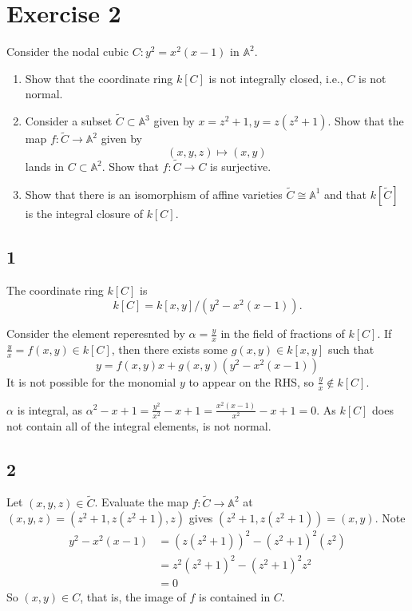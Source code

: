 \documentclass{article}
\theoremstyle{definition}
\theoremstyle{definition}
\theoremstyle{remark}
\begin{document}
\section*{Exercise 2}
Consider the nodal cubic $C: y^2 = x^2(x - 1)$ in $\mathbb{A}^2$.

\begin{enumerate}
    \item Show that the coordinate ring $k[C]$ is not integrally closed, i.e., $C$ is not normal.
    \item Consider a subset $\tilde{C} \subset \mathbb{A}^3$ given by $x = z^2 + 1, y = z(z^2 + 1)$. Show that the map $f: \tilde{C} \to \mathbb{A}^2$ given by
    \[
        (x, y, z) \mapsto (x, y)
    \]
    lands in $C \subset \mathbb{A}^2$. Show that $f: \tilde{C} \to C$ is surjective.
    \item Show that there is an isomorphism of affine varieties $\tilde{C} \cong \mathbb{A}^1$ and that $k[\tilde{C}]$ is the integral closure of $k[C]$.
\end{enumerate}

\subsection*{1}
The coordinate ring $k[C]$ is 
$$
k[C] = k[x, y]/(y^2 - x^2(x-1)).
$$

Consider the element reperesnted by $\alpha = \frac{y}{x}$ in the field of fractions of $k[C]$.
If $\frac{y}{x} = f(x,y) \in k[C]$, then there exists some $g(x, y) \in k[x,y]$ such that 
$$
y = f(x,y)x + g(x,y)(y^2 - x^2(x-1))
$$
It is not possible for the monomial $y$ to appear on the RHS, so $\frac{y}{x} \notin k[C]$.

$\alpha$ is integral, as $ \alpha^2 - x + 1= \frac{y^2}{x^2} - x + 1= \frac{x^2(x-1)}{x^2} -x + 1 = 0$. 
As $k[C]$ does not contain all of the integral elements, is not normal.

\subsection*{2}
Let $(x,y,z) \in \tilde{C}$.
Evaluate the map $f: \tilde{C} \to \mathbb{A}^2$ at $(x, y, z) = (z^2 + 1, z(z^2 + 1), z)$ gives $(z^2 + 1, z(z^2 + 1)) = (x, y)$. 
Note
\begin{align}
	y^2 - x^2(x-1) &= (z(z^2 + 1))^2 - (z^2 + 1)^2(z^2)\\
	&= z^2(z^2 + 1)^2 - (z^2 + 1)^2z^2\\
	&= 0
\end{align}
So $(x, y) \in C$, that is, the image of $f$ is contained in $C$.
\end{document}
